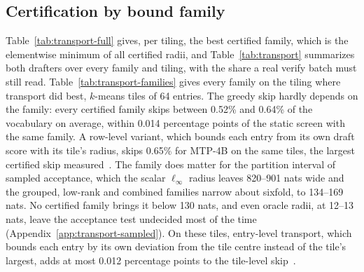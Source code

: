 \subsection{Certification by bound family}\label{app:transport-families}
Table~\ref{tab:transport-full} gives, per tiling, the best certified family, which is the elementwise minimum of all certified radii, and Table~\ref{tab:transport} summarizes both drafters over every family and tiling, with the share a real verify batch must still read. Table~\ref{tab:transport-families} gives every family on the tiling where transport did best, $k$-means tiles of 64 entries. The greedy skip hardly depends on the family: every certified family skips between 0.52\% and 0.64\% of the vocabulary on average, within 0.014 percentage points of the static screen with the same family. A row-level variant, which bounds each entry from its own draft score with its tile's radius, skips 0.65\% for MTP-4B on the same tiles, the largest certified skip measured~. The family does matter for the partition interval of sampled acceptance, which the scalar $\ell_\infty$ radius leaves 820--901 nats wide and the grouped, low-rank and combined families narrow about sixfold, to 134--169 nats. No certified family brings it below 130 nats, and even oracle radii, at 12--13 nats, leave the acceptance test undecided most of the time (Appendix~\ref{app:transport-sampled}). On these tiles, entry-level transport, which bounds each entry by its own deviation from the tile centre instead of the tile's largest, adds at most 0.012 percentage points to the tile-level skip~.

